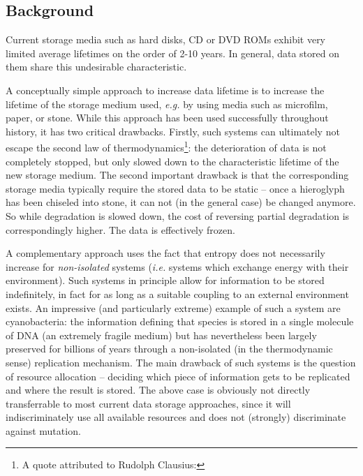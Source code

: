 \documentclass[11pt]{article}
\begin{document}
\newpage
\begin{mainmatter}

\section{Background}

Current storage media such as hard disks, CD or DVD ROMs exhibit very limited average lifetimes on the order of 2-10 years. In general, data stored on them share this undesirable characteristic. 

A conceptually simple approach to increase data lifetime is to increase the lifetime of the storage medium used, \emph{e.g.} by using media such as microfilm, paper, or stone. While this approach has been used successfully throughout history, it has two critical drawbacks.
Firstly, such systems can ultimately not escape the second law of thermodynamics\footnote{
A quote attributed to Rudolph Clausius:
}: the deterioration of data is not completely stopped, but only slowed down to the characteristic lifetime of the new storage medium. The second important drawback is that the corresponding storage media typically require the stored data to be static -- once a hieroglyph has been chiseled into stone, it can not (in the general case) be changed anymore. So while degradation is slowed down, the cost of reversing partial degradation is correspondingly higher. The data is effectively frozen.

A complementary approach uses the fact that entropy does not necessarily increase for \emph{non-isolated} systems (\emph{i.e.} systems which exchange energy with their environment). Such systems in principle allow for information to be stored indefinitely, in fact for as long as a suitable coupling to an external environment exists.  An impressive (and particularly extreme) example of such a system are cyanobacteria: the information defining that species is stored in a single molecule of DNA (an extremely fragile medium) but has nevertheless been largely preserved for billions of years through a non-isolated (in the thermodynamic sense) replication mechanism. The main drawback of such systems is the question of resource allocation -- deciding which piece of information gets to be replicated and where the result is stored. The above case is obviously not directly transferrable to most current data storage approaches, since it will indiscriminately use all available resources and does not (strongly) discriminate against mutation. 


\end{mainmatter}
\end{document}

